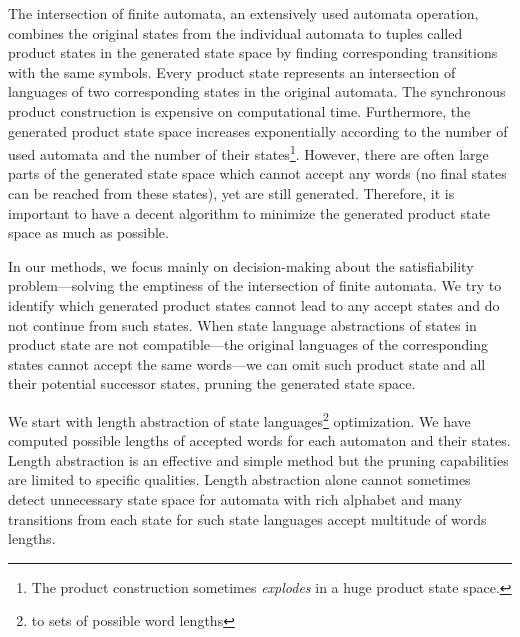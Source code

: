 
The intersection of finite automata, an extensively used automata operation, combines the original states from the individual automata to tuples called product states in the generated state space by finding corresponding transitions with the same symbols. Every product state represents an intersection of languages of two corresponding states in the original automata. The synchronous product construction is expensive on computational time. Furthermore, the generated product state space increases exponentially according to the number of used automata and the number of their states\footnote{The product construction sometimes \emph{explodes} in a huge product state space.}. However, there are often large parts of the generated state space which cannot accept any words (no final states can be reached from these states), yet are still generated. Therefore, it is important to have a decent algorithm to minimize the generated product state space as much as possible.


In our methods, we focus mainly on decision-making about the satisfiability problem---solving the emptiness of the intersection of finite automata. We try to identify which generated product states cannot lead to any accept states and do not continue from such states. When state language abstractions of states in product state are not compatible---the original languages of the corresponding states cannot accept the same words---we can omit such product state and all their potential successor states, pruning the generated state space.


We start with length abstraction of state languages\footnote{to sets of possible word lengths} optimization. We have computed possible lengths of accepted words for each automaton and their states. Length abstraction is an effective and simple method but the pruning capabilities are limited to specific qualities. Length abstraction alone cannot sometimes detect unnecessary state space for automata with rich alphabet and many transitions from each state for such state languages accept multitude of words lengths.

